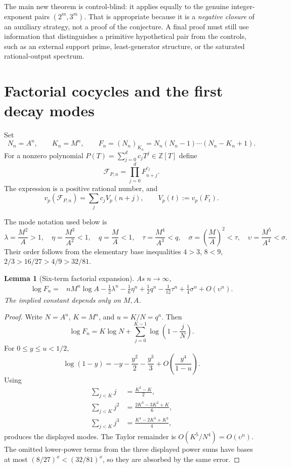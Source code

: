\documentclass[11pt,oneside]{article}
\newtheorem{lemma}[theorem]{Lemma}
\theoremstyle{definition}
\theoremstyle{remark}
\newcommand{\Z}{\mathbb Z}
\newcommand{\vp}[2]{v_{#1}\!\left(#2\right)}
\newcommand{\FF}{\mathcal F}
\begin{document}
The main new theorem is control-blind: it applies equally to the genuine integer-exponent
pairs $(2^m,3^m)$.  That is appropriate because it is a \emph{negative closure} of an
auxiliary strategy, not a proof of the conjecture.  A final proof must still use information
that distinguishes a primitive hypothetical pair from the controls, such as an external
support prime, least-generator structure, or the saturated rational-output spectrum.

\section{Factorial cocycles and the first decay modes}
\label{sec:factorial-setup}

Set
\[
 N_n=A^n,\qquad K_n=M^n,
 \qquad
 F_n=(N_n)_{K_n}=N_n(N_n-1)\cdots(N_n-K_n+1).
\]
For a nonzero polynomial $P(T)=\sum_{j=0}^dc_jT^j\in\Z[T]$ define
\[
 \FF_{P,n}=\prod_{j=0}^dF_{n+j}^{c_j}.
\]
The expression is a positive rational number, and
\[
 \vp p{\FF_{P,n}}=\sum_jc_jV_p(n+j),
 \qquad
 V_p(t):=\vp p{F_t}.
\]

The mode notation used below is
\[
 \lambda=\frac{M^2}{A}>1,
 \quad
 \eta=\frac{M^3}{A^2}<1,
 \quad
 q=\frac MA<1,
 \quad
 \tau=\frac{M^4}{A^3}<q,
 \quad
 \sigma=\left(\frac MA\right)^2<\tau,
 \quad
 \upsilon=\frac{M^5}{A^4}<\sigma.
\]
Their order follows from the elementary base inequalities
$4>3$, $8<9$, $2/3>16/27>4/9>32/81$.

\begin{lemma}[Six-term factorial expansion]
\label{lem:six-mode}
As $n\to\infty$,
\begin{align}
 \log F_n={}&nM^n\log A-\frac12\lambda^n-\frac16\eta^n
 +\frac12q^n-\frac1{12}\tau^n+\frac14\sigma^n
 +O(\upsilon^n).                                    \label{eq:six-mode}
\end{align}
The implied constant depends only on $M,A$.
\end{lemma}

\begin{proof}
Write $N=A^n$, $K=M^n$, and $u=K/N=q^n$.  Then
\[
 \log F_n=K\log N+\sum_{j=0}^{K-1}\log\left(1-\frac jN\right).
\]
For $0\le y\le u<1/2$,
\[
 \log(1-y)=-y-\frac{y^2}{2}-\frac{y^3}{3}
 +O\left(\frac{y^4}{1-u}\right).
\]
Using
\begin{align*}
 \sum_{j<K}j&=\frac{K^2-K}{2},\\
 \sum_{j<K}j^2&=\frac{2K^3-3K^2+K}{6},\\
 \sum_{j<K}j^3&=\frac{K^4-2K^3+K^2}{4},
\end{align*}
produces the displayed modes.  The Taylor remainder is
$O(K^5/N^4)=O(\upsilon^n)$.  The omitted lower-power terms from the three displayed power
sums have bases at most $(8/27)^x< (32/81)^x$, so they are absorbed by the same error.
\end{proof}
\end{document}
